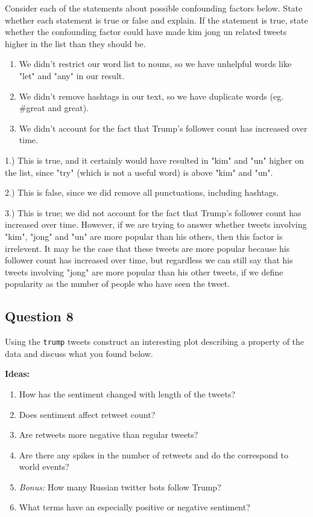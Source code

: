 \documentclass[11pt]{article}
\providecommand{\tightlist}{%
      \setlength{\itemsep}{0pt}\setlength{\parskip}{0pt}}
\begin{document}
Consider each of the statements about possible confounding factors
below. State whether each statement is true or false and explain. If the
statement is true, state whether the confounding factor could have made
kim jong un related tweets higher in the list than they should be.

\begin{enumerate}
\def\labelenumi{\arabic{enumi}.}
\tightlist
\item
  We didn't restrict our word list to nouns, so we have unhelpful words
  like "let" and "any" in our result.
\item
  We didn't remove hashtags in our text, so we have duplicate words (eg.
  \#great and great).
\item
  We didn't account for the fact that Trump's follower count has
  increased over time.
\end{enumerate}

    1.) This is true, and it certainly would have resulted in "kim" and "un"
higher on the list, since "try" (which is not a useful word) is above
"kim" and "un".

2.) This is false, since we did remove all punctuations, including
hashtags.

3.) This is true; we did not account for the fact that Trump's follower
count has increased over time. However, if we are trying to answer
whether tweets involving "kim", "jong" and "un" are more popular than
his others, then this factor is irrelevent. It may be the case that
these tweets are more popular because his follower count has increased
over time, but regardless we can still say that his tweets involving
"jong" are more popular than his other tweets, if we define popularity
as the number of people who have seen the tweet.

    \subsection{Question 8}\label{question-8}

Using the \texttt{trump} tweets construct an interesting plot describing
a property of the data and discuss what you found below.

\textbf{Ideas:}

\begin{enumerate}
\def\labelenumi{\arabic{enumi}.}
\tightlist
\item
  How has the sentiment changed with length of the tweets?
\item
  Does sentiment affect retweet count?
\item
  Are retweets more negative than regular tweets?
\item
  Are there any spikes in the number of retweets and do the correspond
  to world events?
\item
  \emph{Bonus:} How many Russian twitter bots follow Trump?
\item
  What terms have an especially positive or negative sentiment?
\end{enumerate}
\end{document}
